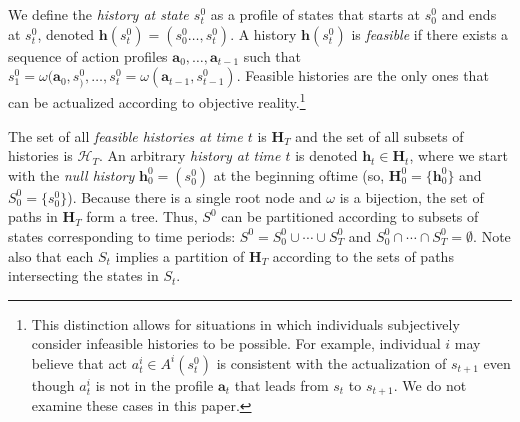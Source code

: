 \documentclass[
11pt,
titlepage,
reqno,
]{article}%
\theoremstyle{definition}
\begin{document}
We define the \textit{history at state $s^0_t$} as a profile of states that starts at $s^0_0$ and ends at $s^0_t$, denoted $\mathbf{h}(s^0_t)=(s^0_0\ldots,s^0_t)$.
A history $\mathbf{h}(s^0_t)$ is \textit{feasible} if there exists a sequence of action profiles $\mathbf{a}_0,\ldots,\mathbf{a}_{t-1}$ such that $s^0_1=\omega(\mathbf{a}_0,s^0_),\ldots, s^0_t=\omega(\mathbf{a}_{t-1},s^0_{t-1})$.
Feasible histories are the only ones that can be actualized according to objective reality.\footnote
{
	This distinction allows for situations in which individuals subjectively consider infeasible histories to be possible. 
	For example, individual $i$ may believe that act $a^i_t\in A^i(s^0_t)$ is consistent with the actualization of $s_{t+1}$ even though $a^i_t$ is not in the profile $\mathbf{a}_t$ that leads from $s_t$ to $s_{t+1}$.
	We do not examine these cases in this paper.
}
	
	
The set of all \textit{feasible histories at time $t$} is $\mathbf{H}_T$ and the set of all subsets of histories is $\mathcal{H}_T$.
An arbitrary \textit{history at time $t$} is denoted $\mathbf{h}_t\in \mathbf{H}_t$, where we start with the \textit{null history} $\mathbf{h}^0_0=(s^0_0)$ at the beginning oftime (so, $\mathbf{H}^0_0=\{\mathbf{h}^0_0\}$ and  $S^0_0=\{s^0_0\}$).   
Because there is a single root node and $\omega$ is a bijection, the set of paths in $\mathbf{H}_T$ form a tree.
Thus, $S^0$ can be partitioned according to  subsets of states corresponding to time periods: $S^0=S^0_0\cup\cdots\cup S^0_T$ and $S^0_0\cap\cdots\cap S^0_T = \emptyset$.
Note also that each $S_t$ implies a partition of $\mathbf{H}_T$ according to the sets of paths intersecting the states in $S_t$.

\end{document}
